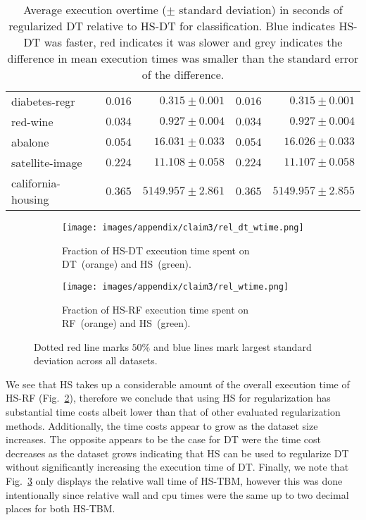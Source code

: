 \begin{table}[hbt]
\begin{tabular}{|l|c|r|c|r|}
    diabetes-regr      &    $0.016$ &     \cellcolor{blue!15}$0.315 \pm 0.001$  & $0.016$ & \cellcolor{blue!15}$0.315 \pm 0.001$ \\
    red-wine           &    $0.034$ &     \cellcolor{blue!15}$0.927 \pm 0.004$  & $0.034$ & \cellcolor{blue!15}$0.927 \pm 0.004$  \\
    abalone            &    $0.054$ &     \cellcolor{blue!15}$16.031 \pm 0.033$ & $0.054$ & \cellcolor{blue!15}$16.026 \pm 0.033$ \\
    satellite-image    &    $0.224$ &     \cellcolor{blue!15}$11.108 \pm 0.058$ & $0.224$ & \cellcolor{blue!15}$11.107 \pm 0.058$ \\
    california-housing &    $0.365$ &     \cellcolor{blue!15}$5149.957 \pm 2.861$         & $0.365$ & \cellcolor{blue!15}$5149.957 \pm 2.855$  \\
    \bottomrule
    \end{tabular}
    \caption{Average execution overtime ($\pm$ standard deviation) in seconds of regularized DT relative to HS-DT for classification. Blue indicates HS-DT was faster, red indicates it was slower and grey indicates the difference in mean execution times was smaller than the standard error of the difference.}
    \label{tab:app-claim3-dt}
\end{table}


\begin{figure}[hbt]
    \begin{subfigure}[b]{0.48\textwidth}
        \centering
        \texttt{[image: images/appendix/claim3/rel\_dt\_wtime.png]}
        \caption{Fraction of HS-DT execution time spent on DT~(orange) and HS~(green). \label{fig:apendix-fig4-dt-rel-time}}
    \end{subfigure}
    \begin{subfigure}[b]{0.48\textwidth}
        \centering
        \texttt{[image: images/appendix/claim3/rel\_wtime.png]}
        \caption{Fraction of HS-RF execution time spent on RF~(orange) and HS~(green). \label{fig:apendix-fig4-rf-rel-time}}
    \end{subfigure}
    \caption{Dotted red line marks $50\%$ and blue lines mark largest standard deviation across all datasets. \label{fig:apendix-fig4-rel-time}}
\end{figure}

We see that HS takes up a considerable amount of the overall execution time of HS-RF (Fig.~\ref{fig:apendix-fig4-rf-rel-time}), therefore we conclude that using HS for regularization has substantial time costs albeit lower than that of other evaluated regularization methods.
Additionally, the time costs appear to grow as the dataset size increases.
The opposite appears to be the case for DT were the time cost decreases as the dataset grows indicating that HS can be used to regularize DT without significantly increasing the execution time of DT.
Finally, we note that Fig.~\ref{fig:apendix-fig4-rel-time} only displays the relative wall time of HS-TBM, however this was done intentionally since relative wall and cpu times were the same up to two decimal places for both HS-TBM.

